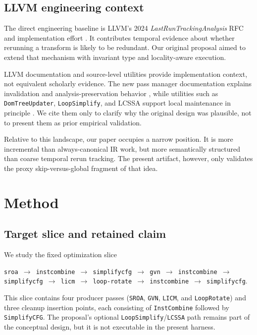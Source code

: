\documentclass{article}
\begin{document}
\subsection{LLVM engineering context}

The direct engineering baseline is LLVM's 2024 \emph{LastRunTrackingAnalysis} RFC and implementation effort \citep{zheng2024lastrun}. It contributes temporal evidence about whether rerunning a transform is likely to be redundant. Our original proposal aimed to extend that mechanism with invariant type and locality-aware execution.

LLVM documentation and source-level utilities provide implementation context, not equivalent scholarly evidence. The new pass manager documentation explains invalidation and analysis-preservation behavior \citep{llvm-new-pass-manager}, while utilities such as \texttt{DomTreeUpdater}, \texttt{LoopSimplify}, and LCSSA support local maintenance in principle \citep{llvm-domtreeupdater,llvm-loopsimplify,llvm-lcssa-ssaupdater}. We cite them only to clarify why the original design was plausible, not to present them as prior empirical validation.

Relative to this landscape, our paper occupies a narrow position. It is more incremental than always-canonical IR work, but more semantically structured than coarse temporal rerun tracking. The present artifact, however, only validates the proxy skip-versus-global fragment of that idea.

\section{Method}
\label{sec:method}

\subsection{Target slice and retained claim}

We study the fixed optimization slice
\begin{center}
\small
\texttt{sroa $\rightarrow$ instcombine $\rightarrow$ simplifycfg $\rightarrow$ gvn $\rightarrow$ instcombine $\rightarrow$ simplifycfg $\rightarrow$ licm $\rightarrow$ loop-rotate $\rightarrow$ instcombine $\rightarrow$ simplifycfg}.
\normalsize
\end{center}
This slice contains four producer passes (\texttt{SROA}, \texttt{GVN}, \texttt{LICM}, and \texttt{LoopRotate}) and three cleanup insertion points, each consisting of \texttt{InstCombine} followed by \texttt{SimplifyCFG}. The proposal's optional \texttt{LoopSimplify}/\texttt{LCSSA} path remains part of the conceptual design, but it is not executable in the present harness.
\end{document}
